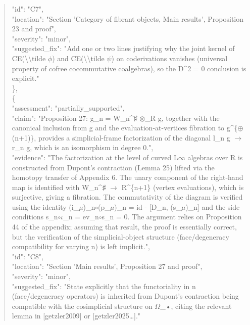 \documentclass[11pt]{article}
\begin{document}
\begin{quote}
      "id": "C7",\\
      "location": "Section 'Category of fibrant objects, Main results', Proposition 23 and proof",\\
      "severity": "minor",\\
      "suggested\_fix": "Add one or two lines justifying why the joint kernel of CE(\textbackslash{}\textbackslash{}tilde \ensuremath{\phi}) and CE(\textbackslash{}\textbackslash{}tilde \ensuremath{\psi}) on coderivations vanishes (universal property of cofree cocommutative coalgebras), so the D\^{}2 = 0 conclusion is explicit."\\
    \},\\
    \{\\
      "assessment": "partially\_supported",\\
      "claim": "Proposition 27: g\_n = W\_n\^{}♯ \ensuremath{\otimes}\_R g, together with the canonical inclusion from g and the evaluation-at-vertices fibration to g\^{}\{\ensuremath{\oplus}(n+1)\}, provides a simplicial-frame factorization of the diagonal l\_n g \ensuremath{\to} r\_n g, which is an isomorphism in degree 0.",\\
      "evidence": "The factorization at the level of curved L\ensuremath{\infty} algebras over R is constructed from Dupont's contraction (Lemma 25) lifted via the homotopy transfer of Appendix 6. The unary component of the right-hand map is identified with W\_n\^{}♯ \ensuremath{\to} R\^{}\{n+1\} (vertex evaluations), which is surjective, giving a fibration. The commutativity of the diagram is verified using the identity (i\_\ensuremath{\mu})\_n\ensuremath{\circ}(p\_\ensuremath{\mu})\_n = id - [D\_n, (s\_\ensuremath{\mu})\_n] and the side conditions s\_n\ensuremath{\circ}\ensuremath{\iota}\_n = ev\_n\ensuremath{\circ}s\_n = 0. The argument relies on Proposition 44 of the appendix; assuming that result, the proof is essentially correct, but the verification of the simplicial-object structure (face/degeneracy compatibility for varying n) is left implicit.",\\
      "id": "C8",\\
      "location": "Section 'Main results', Proposition 27 and proof",\\
      "severity": "minor",\\
      "suggested\_fix": "State explicitly that the functoriality in n (face/degeneracy operators) is inherited from Dupont's contraction being compatible with the cosimplicial structure on \ensuremath{\Omega}\_•, citing the relevant lemma in [getzler2009] or [getzler2025…]."\\

\end{quote}
\end{document}
